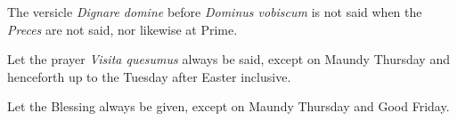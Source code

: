 \documentclass[openany]{book}
\newcommand{\psalm}[1]{%
	\noindent{#1, \textit{\csname psalm#1Incipit\endcsname}}.%
}
\renewcommand{\\}{\par\hspace*{.25em}} %
\renewcommand{\newline}{\par}
\begin{document}
\newline The versicle \emph{Dignare domine} before \emph{Dominus vobiscum} is not said when the \emph{Preces} are not said, nor likewise at Prime.
\newline Let the prayer \emph{Visita quesumus} always be said, except on Maundy Thursday and henceforth up to the Tuesday after Easter inclusive.
\newline Let the Blessing always be given, except on Maundy Thursday and Good Friday.

\end{document}
